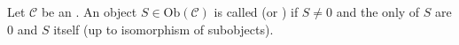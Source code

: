 \begin{definition} \label{definition:simple_object_of_an_additive_category}
Let $\mathcal{C}$ be an . An object $S \in \mathrm{Ob}(\mathcal{C})$ is called  (or ) if $S \neq 0$ and the only  of $S$ are $0$ and $S$ itself (up to isomorphism of subobjects).
\end{definition}
